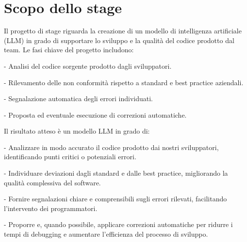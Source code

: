 \section{Scopo dello stage}
Il progetto di stage riguarda la creazione di un modello di intelligenza artificiale (LLM) in grado di supportare lo sviluppo e la qualità del codice prodotto dal team. Le fasi chiave del progetto includono:

- Analisi del codice sorgente prodotto dagli sviluppatori.

- Rilevamento delle non conformità rispetto a standard e best practice aziendali.

-  Segnalazione automatica degli errori individuati.

- Proposta ed eventuale esecuzione di correzioni automatiche.

Il risultato atteso è un modello LLM in grado di:

- Analizzare in modo accurato il codice prodotto dai nostri sviluppatori, identificando punti critici o potenziali errori.

- Individuare deviazioni dagli standard e dalle best practice, migliorando la qualità complessiva del software.

- Fornire segnalazioni chiare e comprensibili sugli errori rilevati, facilitando l’intervento dei programmatori.

- Proporre e, quando possibile, applicare correzioni automatiche per ridurre i tempi di debugging e aumentare l’efficienza del processo di sviluppo.

